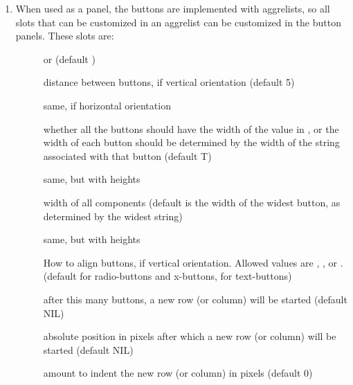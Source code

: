 \begin{enumerate}
\item When used as a panel, the buttons are implemented
with aggrelists, so all slots that can be customized in an aggrelist
can be customized in the button panels.  These slots are:
\begin{description}
\item[]  \dash {} or  (default )

\item[]  \dash distance between buttons, if vertical orientation (default 5)

\item[]  \dash same, if horizontal orientation

\item[]  \dash whether all the buttons should have the width of
the value in , or the width of each button
should be determined by the width of the string associated with that
button (default T)

\item[]  \dash same, but with heights

\item[]  \dash width of all components (default is the width
of the widest button, as determined by the widest string)

\item[]  \dash same, but with heights

\item[]  \dash How to align buttons, if vertical orientation.
Allowed values are , , or . (default
 for radio-buttons and x-buttons,  for
text-buttons)

\item[]  \dash after this many buttons, a new row (or column)
will be started (default NIL)

\item[]  \dash absolute position in pixels after which a new row
(or column) will be started (default NIL)

\item[]  \dash amount to indent the new row (or column) in pixels
(default 0)
\end{description}


\end{enumerate}
